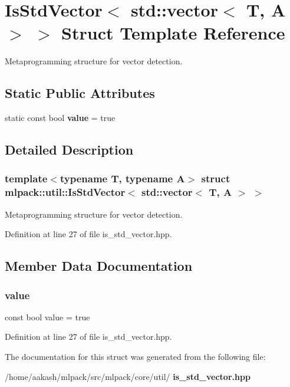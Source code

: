 \section{Is\+Std\+Vector$<$ std\+:\+:vector$<$ T, A $>$ $>$ Struct Template Reference}
\label{structmlpack_1_1util_1_1IsStdVector_3_01std_1_1vector_3_01T_00_01A_01_4_01_4}


Metaprogramming structure for vector detection.  


\subsection*{Static Public Attributes}
\begin{DoxyCompactItemize}
\item 
static const bool \textbf{ value} = true
\end{DoxyCompactItemize}


\subsection{Detailed Description}
\subsubsection*{template$<$typename T, typename A$>$\newline
struct mlpack\+::util\+::\+Is\+Std\+Vector$<$ std\+::vector$<$ T, A $>$ $>$}

Metaprogramming structure for vector detection. 

Definition at line 27 of file is\+\_\+std\+\_\+vector.\+hpp.



\subsection{Member Data Documentation}
\mbox{\label{structmlpack_1_1util_1_1IsStdVector_3_01std_1_1vector_3_01T_00_01A_01_4_01_4_a11ddd051208250c32dc4985abcafa86d}} 
\subsubsection{value}
{\footnotesize\ttfamily const bool value = true\hspace{0.3cm}{\ttfamily [static]}}



Definition at line 27 of file is\+\_\+std\+\_\+vector.\+hpp.



The documentation for this struct was generated from the following file\+:\begin{DoxyCompactItemize}
\item 
/home/aakash/mlpack/src/mlpack/core/util/\textbf{ is\+\_\+std\+\_\+vector.\+hpp}\end{DoxyCompactItemize}
